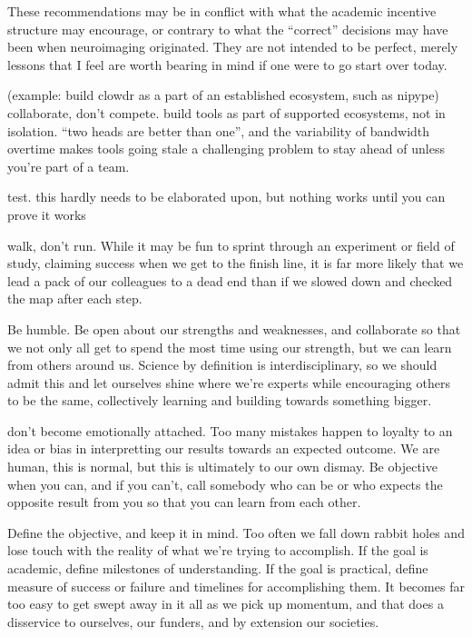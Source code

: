 These recommendations may be in conflict with what the academic incentive structure may encourage, or contrary to what
the ``correct'' decisions may have been when neuroimaging originated. They are not intended to be perfect, merely
lessons that I feel are worth bearing in mind if one were to go start over today.

(example: build clowdr as a part of an established ecosystem, such as nipype)
collaborate, don't compete. build tools as part of supported ecosystems, not in isolation. ``two heads are better
than one'', and the variability of bandwidth overtime makes tools going stale a challenging problem to stay ahead of
unless you're part of a team.

test. this hardly needs to be elaborated upon, but nothing works until you can prove it works

walk, don't run. While it may be fun to sprint through an experiment or field of study, claiming success when we get to
the finish line, it is far more likely that we lead a pack of our colleagues to a dead end than if we slowed down and
checked the map after each step.

Be humble. Be open about our strengths and weaknesses, and collaborate so that we not only all get to spend the most
time using our strength, but we can learn from others around us. Science by definition is interdisciplinary, so we
should admit this and let ourselves shine where we're experts while encouraging others to be the same, collectively
learning and building towards something bigger.

don't become emotionally attached. Too many mistakes happen to loyalty to an idea or bias in interpretting our results
towards an expected outcome. We are human, this is normal, but this is ultimately to our own dismay. Be objective when
you can, and if you can't, call somebody who can be or who expects the opposite result from you so that you can learn
from each other.

Define the objective, and keep it in mind. Too often we fall down rabbit holes and lose touch with the reality of what
we're trying to accomplish. If the goal is academic, define milestones of understanding. If the goal is practical,
define measure of success or failure and timelines for accomplishing them. It becomes far too easy to get swept away in
it all as we pick up momentum, and that does a disservice to ourselves, our funders, and by extension our societies.

